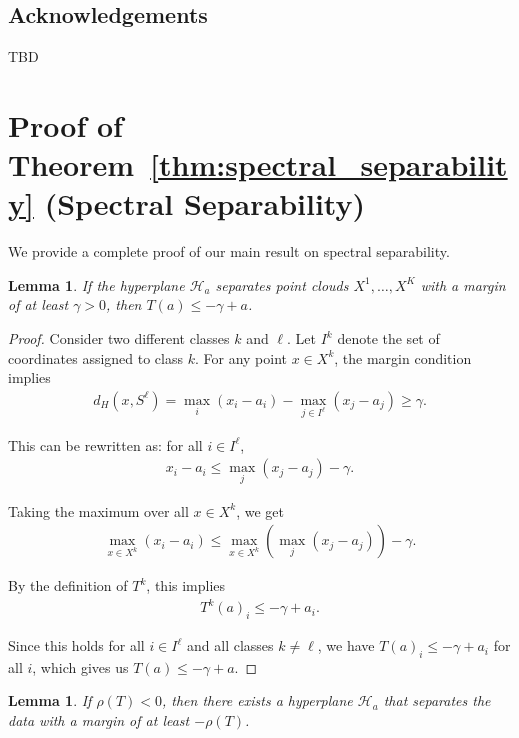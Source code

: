 \documentclass{article}
\newtheorem{lemma}[theorem]{Lemma}
\begin{document}
\subsection*{Acknowledgements}

TBD




\newpage
\appendix
\section{Proof of Theorem~\ref{thm:spectral_separability} (Spectral Separability)}\label{appendix:proofs}
We provide a complete proof of our main result on spectral separability.

\begin{lemma}\label{lemma:hyperplane_to_operator}
If the hyperplane $\mathcal{H}_a$ separates point clouds $X^1,\ldots,X^K$ with a margin of at least $\gamma > 0$, then $T(a) \leq -\gamma + a$.
\end{lemma}

\begin{proof}
Consider two different classes $k$ and $\ell$. Let $I^k$ denote the set of coordinates assigned to class $k$. For any point $x \in X^k$, the margin condition implies
\begin{align}
d_H(x, S^{\ell}) = \max_i(x_i - a_i) - \max_{j \in I^{\ell}}(x_j - a_j) \geq \gamma.
\end{align}

This can be rewritten as: for all $i \in I^{\ell}$,
\begin{align}
x_i - a_i \leq \max_j(x_j - a_j) - \gamma.
\end{align}

Taking the maximum over all $x \in X^k$, we get
\begin{align}
\max_{x \in X^k}(x_i - a_i) \leq \max_{x \in X^k}(\max_j(x_j - a_j)) - \gamma.
\end{align}

By the definition of $T^k$, this implies
\begin{align}
T^k(a)_i \leq -\gamma + a_i.
\end{align}

Since this holds for all $i \in I^{\ell}$ and all classes $k \neq \ell$, we have $T(a)_i \leq -\gamma + a_i$ for all $i$, which gives us $T(a) \leq -\gamma + a$.
\end{proof}

\begin{lemma}\label{lemma:operator_to_hyperplane}
If $\rho(T) < 0$, then there exists a hyperplane $\mathcal{H}_a$ that separates the data with a margin of at least $-\rho(T)$.
\end{lemma}
\end{document}
